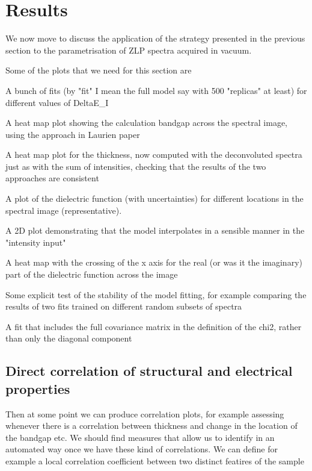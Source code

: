 \section{Results}
\label{sec:results_vacuum}

We now move to discuss the application of the strategy presented in the previous
section to the parametrisation of ZLP spectra acquired in vacuum.

Some of the plots that we need for this section are

A bunch of fits (by "fit" I mean the full model say with 500 "replicas" at least) for different values of DeltaE_I

A heat map plot showing the calculation bandgap across the spectral image, using the approach in Laurien paper

A heat map plot for the thickness, now computed with the deconvoluted spectra just as with the sum of intensities, checking that the results of the two approaches are consistent

A plot of the dielectric function (with uncertainties) for different locations in the spectral image (representative).

A 2D plot demonstrating that the model interpolates in a sensible manner in the "intensity input"

A heat map with the crossing of the x axis for the real (or was it the imaginary) part of the dielectric function across the image

Some explicit test of the stability of the model fitting, for example comparing the results of two fits trained on different random subsets of spectra

A fit that includes the full covariance matrix in the definition of the chi2, rather than only the diagonal component


\subsection{Direct correlation of structural and electrical properties}

Then at some point we can produce correlation plots, for example assessing whenever there is a correlation between thickness and change in the location of the bandgap etc. We should find measures that allow us to identify
in an automated way once we have these kind of correlations.
%
We can define for example a local correlation coefficient between
two distinct featires of the sample

